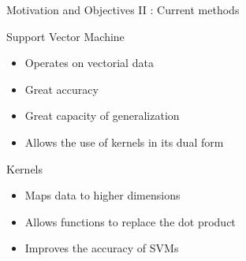 \documentclass[compress]{beamer}
\begin{document}
\begin{frame}{Motivation and Objectives II : Current methods}
	\begin{block}{Support Vector Machine \citep{cortes_support-vector_1995}}
		\begin{itemize}
			\item Operates on vectorial data
			\item Great accuracy
			\item Great capacity of generalization
			\item Allows the use of kernels in its dual form
		\end{itemize}
	\end{block}
	\begin{block}{Kernels}
		\begin{itemize}
			\item Maps data to higher dimensions
			\item Allows functions to replace the dot product
			\item Improves the accuracy of SVMs
		\end{itemize}
	\end{block}
\end{frame}
\end{document}
